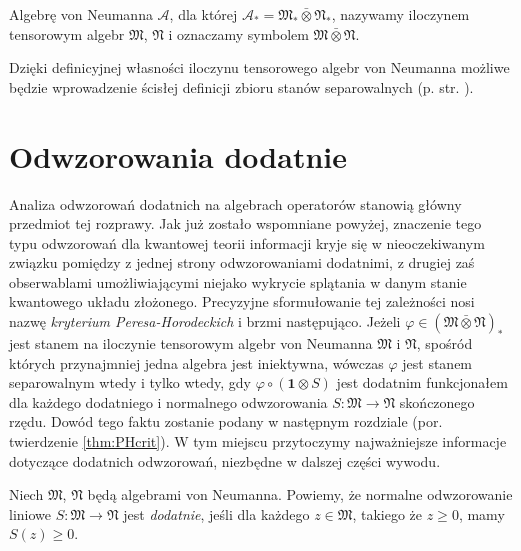 \begin{Definition}
 \label{def:TensorProductOfvN}
    Algebrę von Neumanna $\mathcal{A}$, dla której
    $\mathcal{A}_{*} = \mathfrak{M}_{*} \bar{\otimes} \mathfrak{N}_{*}$,
    nazywamy iloczynem tensorowym algebr $\mathfrak{M}$, $\mathfrak{N}$
    i oznaczamy symbolem
    $\mathfrak{M} \bar{\otimes} \mathfrak{N}$.
\end{Definition}

Dzięki definicyjnej własności iloczynu tensorowego algebr von Neumanna
możliwe będzie wprowadzenie ścisłej definicji zbioru stanów separowalnych
(p. str. \pageref{def:SeparableStates}).

\section{Odwzorowania dodatnie}
Analiza odwzorowań dodatnich na algebrach operatorów stanowią główny przedmiot
tej rozprawy.
Jak już zostało wspomniane powyżej, znaczenie tego typu odwzorowań dla kwantowej
teorii informacji kryje się w nieoczekiwanym związku pomiędzy z jednej strony
odwzorowaniami dodatnimi,
z drugiej zaś obserwablami umożliwiającymi niejako wykrycie splątania w
danym stanie kwantowego układu złożonego.
Precyzyjne sformułowanie tej zależności nosi nazwę
\emph{kryterium Peresa-Horodeckich} i brzmi następująco.
Jeżeli $\varphi \in (\mathfrak{M} \bar{\otimes} \mathfrak{N})_{*}$ jest stanem
na iloczynie tensorowym algebr von Neumanna
$\mathfrak{M}$ i $\mathfrak{N}$,
spośród których przynajmniej jedna algebra jest iniektywna,
wówczas $\varphi$ jest stanem separowalnym wtedy i tylko wtedy,
gdy $\varphi \circ (\mathbf{1} \otimes S)$ jest dodatnim funkcjonałem
dla każdego dodatniego i normalnego odwzorowania
$S: \mathfrak{M} \rightarrow \mathfrak{N}$
skończonego rzędu.
Dowód tego faktu zostanie podany w następnym rozdziale
(por. twierdzenie \ref{thm:PHcrit}).
W tym miejscu przytoczymy najważniejsze informacje dotyczące dodatnich
odwzorowań, niezbędne w dalszej części wywodu.

\begin{Definition}
Niech $\mathfrak{M}$, $\mathfrak{N}$ będą algebrami von Neumanna.
Powiemy, że normalne odwzorowanie liniowe
$S: \mathfrak{M} \rightarrow \mathfrak{N}$
jest \emph{dodatnie},
jeśli dla każdego $z \in \mathfrak{M}$,
takiego że $z \geq 0$, mamy
$S(z) \geq 0$.
\end{Definition}

